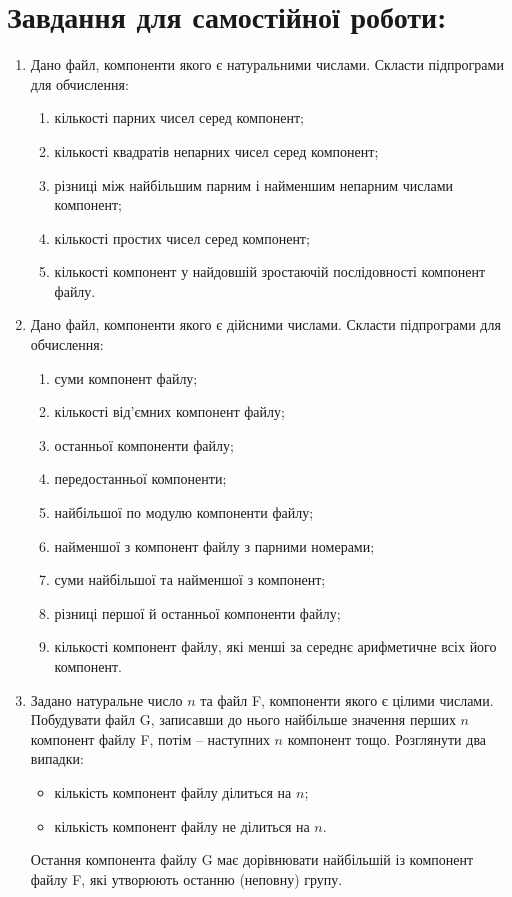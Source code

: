 \documentclass[a5paper,titlepage,openany,twoside,
]
{book_unv}%
\makeatletter
\newcommand{\xslalph}[1]{\expandafter\@xslalph\csname c@#1\endcsname}
\newcommand{\@xslalph}[1]{%
    \ifcase#1\or а\or б\or в\or г\or д\or e\or є\or ж\or з\or i%
    \or й\or к\or л\or м\or н\or о\or п\or р\or с\or т%
    \or у\or ф\or х\or ц\or ч\or ш\or ю\or я\or аа\or бб\or вв%
    \else\@ctrerr\fi%
}
\makeatother
\begin{document}
\begin{enumerate}
\begin{enumerate}
\begin{enumerate}[label=\xslalph*)]
\end{enumerate}

\end{enumerate}


\section{Завдання для самостійної роботи:}

\begin{enumerate}
\def\labelenumi{\arabic{enumi})}
\setcounter{enumi}{5}
\item
  Дано файл, компоненти якого є натуральними числами. Скласти
  підпрограми для обчислення:
\begin{enumerate}[label=\xslalph*)]
\item
кількості парних чисел серед компонент;
\item
кількості квадратів непарних чисел серед компонент;
\item
різниці між найбільшим парним і найменшим непарним числами компонент;
\item
кількості простих чисел серед компонент;
\item  
кількості компонент у найдовшій зростаючій послідовності компонент
файлу.
\end{enumerate}

\item
  Дано файл, компоненти якого є дійсними числами. Скласти підпрограми
  для обчислення:
\begin{enumerate}[label=\xslalph*)]
\item
суми компонент файлу;
\item
кількості від'ємних компонент файлу;
\item
останньої компоненти файлу;
\item
передостанньої компоненти;
\item 
найбільшої по модулю компоненти файлу;
\item
найменшої з компонент файлу з парними номерами;
\item 
суми найбільшої та найменшої з компонент;
\item
різниці першої й останньої компоненти файлу;
\item
кількості компонент файлу, які менші за середнє арифметичне всіх його
компонент.
\end{enumerate}


\item
  Задано натуральне число $n$ та файл F, компоненти якого є цілими
  числами. Побудувати файл G, записавши до нього найбільше значення
  перших $n$ компонент файлу F, потім -- наступних $n$ компонент тощо.
  Розглянути два випадки:
\begin{itemize}
\item
кількість компонент файлу ділиться на $n$;
\item
кількість компонент файлу не ділиться на $n$. 
\end{itemize}
Остання компонента файлу G має дорівнювати найбільшій із компонент 
файлу F, які утворюють останню (неповну) групу.


\end{enumerate}
\end{enumerate}
\end{document}
